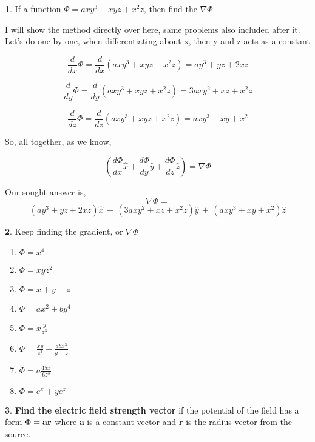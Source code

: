 \documentclass[11pt,a4paper,twocolumn]{article}
\theoremstyle{definition}
\theoremstyle{definition}
\newtheorem{pr}{ \framebox[0.05\textwidth]{Pr} }
\theoremstyle{definition}
\theoremstyle{definition}
\begin{document}
\begin{pr}
If a function $\Phi = axy ^3 + xyz + x^2z$, then find the $ \nabla \Phi $
\end{pr}

\begin{small}
I will show the method directly over here, same problems also included after it.
\\
Let's do one by one, when differentiating about x, then y and z acts as a constant

\[ \frac{d}{dx} \Phi = \frac{d}{dx} (axy ^3 + xyz + x^2z) = 
	ay^3 + yz + 2xz \]
	
\[ \frac{d}{dy} \Phi = \frac{d}{dy} (axy ^3 + xyz + x^2z) =
	3axy^2 + xz + x^2z \]
	
\[ \frac{d}{dz} \Phi = \frac{d}{dz} (axy ^3 + xyz + x^2z) =
	axy^3 + xy + x^2 \]
	
So, all together, as we know,

 \[ \left(	\frac{d \Phi}{dx} \hat{x} + \frac{d \Phi}{dy} \hat{y} + \frac{d \Phi}{dz} \hat{z} \right)  = \nabla \Phi \]	

Our sought answer is,
\[\nabla\Phi = \]
\[ (ay^3 + yz + 2xz) \hat{x} \, + \, (3axy^2 + xz + x^2z) \hat{y} \, + \, (axy^3 + xy + x^2) \hat{z} \]


\end{small}

\begin{pr}
Keep finding the gradient, or $ \nabla \Phi $ 
\begin{enumerate}
\item $\Phi= x^4 $
\item $\Phi= x y z^2 $
\item $\Phi= x + y +z $
\item $\Phi= ax^2 + by^4$
\item $\Phi= x\frac{y}{z^3}$
\item $\Phi= \frac{xy}{z^3} + \frac{abx^3}{y - z} $
\item $\Phi= a\frac{45x}{6z^3} $
\item $\Phi= e^x + ye^z $
\end{enumerate}
\end{pr}

\begin{pr} \label{pr5}
\textbf{Find the electric field strength vector} if the potential of the field has a form $\Phi = \text{\textbf{ar}}$ where \textbf{a} is a constant vector and \textbf{r} is the radius vector from the source.
\end{pr}
\end{document}

